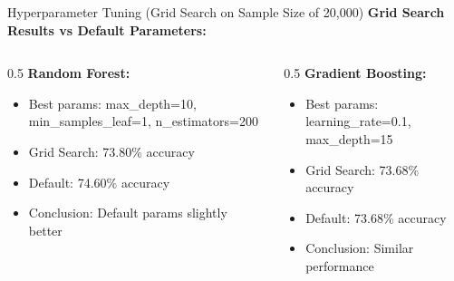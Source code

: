 \documentclass[aspectratio=169]{beamer}
\begin{document}
\begin{frame}{Hyperparameter Tuning (Grid Search on Sample Size of 20,000)}
\textbf{Grid Search Results vs Default Parameters:}
\bigskip
\begin{columns}
\begin{column}{0.5\textwidth}
\textbf{Random Forest:}
\begin{itemize}
    \item Best params: max\_depth=10, min\_samples\_leaf=1, n\_estimators=200
    \item Grid Search: 73.80\% accuracy
    \item Default: 74.60\% accuracy
    \item Conclusion: Default params slightly better
\end{itemize}
\end{column}
\begin{column}{0.5\textwidth}
\textbf{Gradient Boosting:}
\begin{itemize}
    \item Best params: learning\_rate=0.1, max\_depth=15
    \item Grid Search: 73.68\% accuracy
    \item Default: 73.68\% accuracy
    \item Conclusion: Similar performance
\end{itemize}
\end{column}
\end{columns}
\end{frame}
\end{document}
